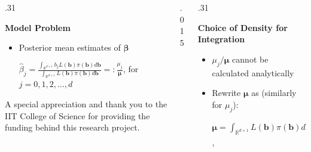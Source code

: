 \documentclass[final,mathserif]{beamer}
\newcommand{\blue}[1]{{\color{myblue}#1}}
\newcommand{\black}[1]{{\color{black}#1}}
\renewcommand{\blue}{\textcolor{blue!80!black}}
\begin{document}
\begin{frame}[fragile]
\begin{columns}[t]
\begin{column}{.31\linewidth}
\begin{block}{\Large \textbf{\blue {Model Problem}}}
\begin{itemize}
\vspace{.15in}

\item Posterior mean estimates of $\boldsymbol{\beta}$

\vspace{.15in}

 $\hat{\beta}_j=\frac{\int_{\mathbb{R}^{d+1}}b_jL(\boldsymbol{b})\pi(\boldsymbol{b})d\boldsymbol{b}}{\int_{\mathbb{R}^{d+1}}L(\boldsymbol{b})\pi(\boldsymbol{b})d\boldsymbol{b}} =: \frac{\mu_j}{\boldsymbol{\mu}}$, for $j=0, 1, 2,\ldots, d$


\end{itemize}
\end{block}

\vspace{0.75in}

\begin{block}
{\small{\black{A special appreciation and thank you to the IIT College of Science for providing the funding behind this research project.}}}
\end{block}

\end{column}


\begin{column}{.015\linewidth} \end{column} %

\begin{column}{.31\linewidth}

\begin{block}{\Large \textbf{\blue {Choice of Density for Integration}}}
\vspace{.1in}
\begin{itemize}
\item $\mu_j/\boldsymbol{\mu}$ cannot be calculated analytically

\item Rewrite $\boldsymbol{\mu}$ as (similarly for $\mu_j$): 

\vspace{.15in}

$\boldsymbol{\mu}=\int_{\mathbb{R}^{d+1}}L(\boldsymbol{b})\pi(\boldsymbol{b})d\boldsymbol{b}=\int_{\mathbb{R}^{d+1}}\frac{L(\boldsymbol{b})\pi(\boldsymbol{b})}{\rho(\boldsymbol{b})}\rho(\boldsymbol{b})d\boldsymbol{b}=\int_{[0,1]^{d+1}}f(\boldsymbol{x})d\boldsymbol{x}$,

\vspace{.15in}


\end{itemize}
\end{block}
\end{column}
\end{columns}
\end{frame}
\end{document}
